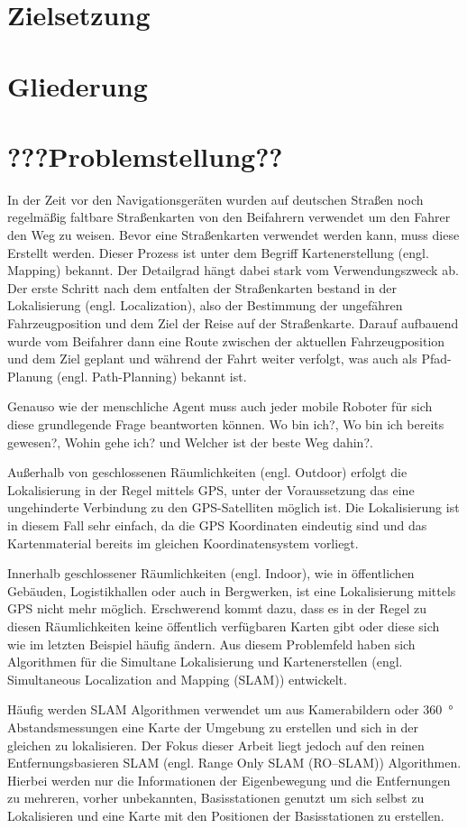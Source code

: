 \section{Zielsetzung}

\section{Gliederung}

\section{???Problemstellung??}

In der Zeit vor den Navigationsgeräten wurden auf deutschen Straßen noch regelmäßig faltbare Straßenkarten von den Beifahrern verwendet um den Fahrer den Weg zu weisen. Bevor eine Straßenkarten verwendet werden kann, muss diese Erstellt werden. Dieser Prozess ist unter dem Begriff Kartenerstellung (engl. Mapping) bekannt. Der Detailgrad hängt dabei stark vom Verwendungszweck ab. Der erste Schritt nach dem entfalten der Straßenkarten bestand in der Lokalisierung (engl. Localization), also der Bestimmung der ungefähren Fahrzeugposition und dem Ziel der Reise auf der Straßenkarte. Darauf aufbauend wurde vom Beifahrer dann eine Route zwischen der aktuellen Fahrzeugposition und dem Ziel geplant und während der Fahrt weiter verfolgt, was auch als Pfad-Planung (engl. Path-Planning) bekannt ist.

Genauso wie der menschliche Agent muss auch jeder mobile Roboter für sich diese grundlegende Frage beantworten können. \glqq Wo bin ich?\grqq{}, \glqq Wo bin ich bereits gewesen?\grqq, \glqq Wohin gehe ich?\grqq{} und \glqq Welcher ist der beste Weg dahin?\grqq{}\cite{murphy2000introduction}.

Außerhalb von geschlossenen Räumlichkeiten (engl. Outdoor) erfolgt die Lokalisierung in der Regel mittels GPS, unter der Voraussetzung das eine ungehinderte Verbindung zu den GPS-Satelliten möglich ist. Die Lokalisierung ist in diesem Fall sehr einfach, da die GPS Koordinaten eindeutig sind und das Kartenmaterial bereits im gleichen Koordinatensystem vorliegt.

Innerhalb geschlossener Räumlichkeiten (engl. Indoor), wie in öffentlichen Gebäuden, Logistikhallen oder auch in Bergwerken, ist eine Lokalisierung mittels GPS nicht mehr möglich. Erschwerend kommt dazu, dass es in der Regel zu diesen Räumlichkeiten keine öffentlich verfügbaren Karten gibt oder diese sich wie im letzten Beispiel häufig ändern. Aus diesem Problemfeld haben sich Algorithmen für die Simultane Lokalisierung und Kartenerstellen (engl. Simultaneous Localization and Mapping (SLAM)) entwickelt.

Häufig werden SLAM Algorithmen verwendet um aus Kamerabildern oder \SI{360}{\degree} Abstandsmessungen eine Karte der Umgebung zu erstellen und sich in der gleichen zu lokalisieren. Der Fokus dieser Arbeit liegt jedoch auf den reinen Entfernungsbasieren SLAM (engl. Range Only SLAM (RO--SLAM)) Algorithmen. Hierbei werden nur die Informationen der Eigenbewegung und die Entfernungen zu mehreren, vorher unbekannten, Basisstationen genutzt um sich selbst zu Lokalisieren und eine Karte mit den Positionen der Basisstationen zu erstellen.
